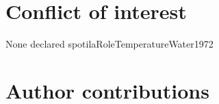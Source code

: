 \section*{Conflict of interest}
\label{sec:conflict1}

None declared
spotilaRoleTemperatureWater1972
\section*{Author contributions}
\label{sec:author1}

\cleardoublepage

\begin{otherlanguage}{english}

\end{otherlanguage}
